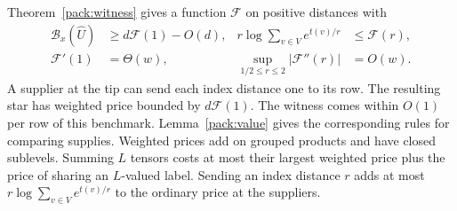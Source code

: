 Theorem~\ref{pack:witness} gives a function $\mathcal F$ on positive
distances with
\begin{align}
 \mathcal B_x(\widehat U)&\ge d\mathcal F(1)-O(d),&
 r\log\sum_{v\in V} e^{t(v)/r}&\le \mathcal F(r),\nonumber\\
 \mathcal F'(1)&=\Theta(w),&
 \sup_{1/2\le r\le2}|\mathcal F''(r)|&=O(w).
 \label{eq:pack-interface}
\end{align}
A supplier at the tip can send each index distance one to its row.
The resulting star has weighted price bounded by $d\mathcal F(1)$.
The witness comes within $O(1)$ per row of this benchmark.
Lemma~\ref{pack:value} gives the corresponding rules for comparing
supplies. Weighted prices add on grouped products and have closed
sublevels. Summing $L$ tensors costs at most their largest weighted
price plus the price of sharing an $L$-valued label. Sending an index
distance $r$ adds at most $r\log\sum_{v\in V}e^{t(v)/r}$ to the
ordinary price at the suppliers.

